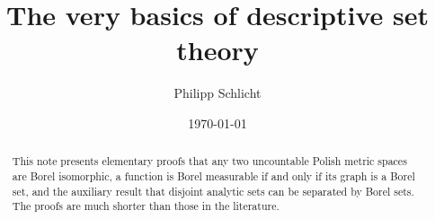 \documentclass[10pt]{amsart}
\theoremstyle{definition}
\theoremstyle{remark}
\begin{document}




\author{Philipp Schlicht}
\address{Philipp Schlicht, School of Mathematics, University of Bristol, Fry Building, Woodland Road, Bristol, BS8 1UG, UK}
\urladdr{}

\date{\today}


\title[Basics of descriptive set theory]{The very basics of descriptive set theory}


\maketitle


\setcounter{tocdepth}{2}






\begin{abstract} 
This note presents elementary proofs that any two uncountable Polish metric spaces are Borel isomorphic, a function is Borel measurable if and only if its graph is a Borel set, and the auxiliary result that disjoint analytic sets can be separated by Borel sets. 
The proofs are much shorter than those in the literature. 
\end{abstract} 

\end{document}
